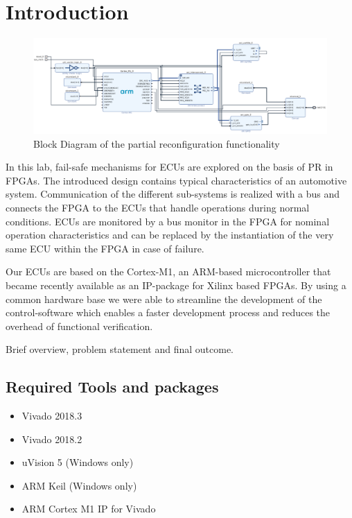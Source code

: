 \section{Introduction}
\begin{figure}[t]
    \centering
    \includegraphics[width=\textwidth]{figures/pr_blockDesign.pdf}
    \caption{Block Diagram of the partial reconfiguration functionality}\label{fig:prBlockDesign}
\end{figure}

In this lab, fail-safe mechanisms for \glspl{ECU} are explored on the basis of \gls{PR} in \glspl{FPGA}.
The introduced design contains typical characteristics of an automotive system.
Communication of the different sub-systems is realized with a bus and connects the \gls{FPGA} to the \glspl{ECU} that handle operations during normal conditions. 
\glspl{ECU} are monitored by a bus monitor in the \gls{FPGA} for nominal operation characteristics and can be replaced by the instantiation of the very same \gls{ECU} within the \gls{FPGA} in case of failure.

Our \glspl{ECU} are based on the Cortex-M1, an ARM-based microcontroller that became recently available as an \gls{IP}-package for Xilinx based \glspl{FPGA}.
By using a common hardware base we were able to streamline the development of the control-software which enables a faster development process and reduces the overhead of functional verification.
 
Brief overview, problem statement and final outcome.

\subsection{Required Tools and packages}

\begin{itemize}
    \item Vivado 2018.3
    \item Vivado 2018.2
    \item uVision 5 (Windows only)
    \item ARM Keil (Windows only)
    \item ARM Cortex M1 IP for Vivado
\end{itemize}

